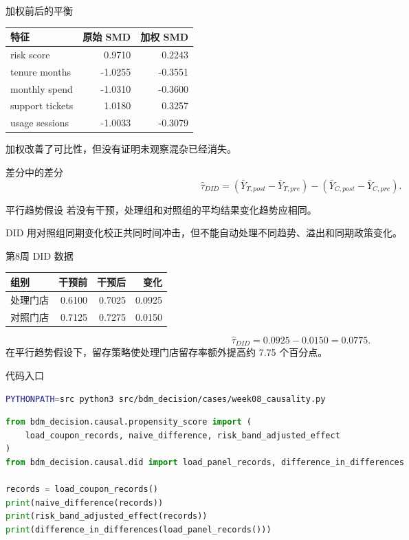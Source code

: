 \documentclass[UTF8,fontset=fandol,aspectratio=169,11pt]{ctexbeamer}
\begin{document}
\begin{frame}{加权前后的平衡}
\begin{center}
\begin{tabular}{lrr}
\toprule
特征 & 原始 SMD & 加权 SMD\\
\midrule
risk score & 0.9710 & 0.2243\\
tenure months & -1.0255 & -0.3551\\
monthly spend & -1.0310 & -0.3600\\
support tickets & 1.0180 & 0.3257\\
usage sessions & -1.0033 & -0.3079\\
\bottomrule
\end{tabular}
\end{center}
\small
加权改善了可比性，但没有证明未观察混杂已经消失。
\end{frame}

\begin{frame}{差分中的差分}
\[
  \widehat{\tau}_{DID}
  =
  (\bar Y_{T,post}-\bar Y_{T,pre})
  -
  (\bar Y_{C,post}-\bar Y_{C,pre}).
\]
\begin{block}{平行趋势假设}
若没有干预，处理组和对照组的平均结果变化趋势应相同。
\end{block}
\small
DID 用对照组同期变化校正共同时间冲击，但不能自动处理不同趋势、溢出和同期政策变化。
\end{frame}

\begin{frame}{第8周 DID 数据}
\begin{center}
\begin{tabular}{lrrr}
\toprule
组别 & 干预前 & 干预后 & 变化\\
\midrule
处理门店 & 0.6100 & 0.7025 & 0.0925\\
对照门店 & 0.7125 & 0.7275 & 0.0150\\
\bottomrule
\end{tabular}
\end{center}
\[
  \widehat{\tau}_{DID}=0.0925-0.0150=0.0775.
\]
\small
在平行趋势假设下，留存策略使处理门店留存率额外提高约 7.75 个百分点。
\end{frame}

\begin{frame}[fragile]{代码入口}
\begin{lstlisting}[language=bash]
PYTHONPATH=src python3 src/bdm_decision/cases/week08_causality.py
\end{lstlisting}

\begin{lstlisting}[language=Python]
from bdm_decision.causal.propensity_score import (
    load_coupon_records, naive_difference, risk_band_adjusted_effect
)
from bdm_decision.causal.did import load_panel_records, difference_in_differences

records = load_coupon_records()
print(naive_difference(records))
print(risk_band_adjusted_effect(records))
print(difference_in_differences(load_panel_records()))
\end{lstlisting}
\end{frame}
\end{document}
